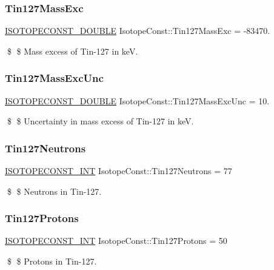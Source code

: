 \subsubsection{\texorpdfstring{Tin127\+Mass\+Exc}{Tin127MassExc}}
{\footnotesize\ttfamily \mbox{\hyperlink{group___isotope_const-_macros_ga8f45a7272ce02c0b4c65c44636ed719a}{I\+S\+O\+T\+O\+P\+E\+C\+O\+N\+S\+T\+\_\+\+D\+O\+U\+B\+LE}} Isotope\+Const\+::\+Tin127\+Mass\+Exc = -\/83470.}

\$ \$ Mass excess of Tin-\/127 in keV. \mbox{\label{group___isotope_const-_tin-_sn127_ga223b64a9a1fed5db23e75452f06ca7f2}} 
\subsubsection{\texorpdfstring{Tin127\+Mass\+Exc\+Unc}{Tin127MassExcUnc}}
{\footnotesize\ttfamily \mbox{\hyperlink{group___isotope_const-_macros_ga8f45a7272ce02c0b4c65c44636ed719a}{I\+S\+O\+T\+O\+P\+E\+C\+O\+N\+S\+T\+\_\+\+D\+O\+U\+B\+LE}} Isotope\+Const\+::\+Tin127\+Mass\+Exc\+Unc = 10.}

\$ \$ Uncertainty in mass excess of Tin-\/127 in keV. \mbox{\label{group___isotope_const-_tin-_sn127_ga81f1b0bce1cccc58d281ed7a2bd7276e}} 
\subsubsection{\texorpdfstring{Tin127\+Neutrons}{Tin127Neutrons}}
{\footnotesize\ttfamily \mbox{\hyperlink{group___isotope_const-_macros_ga5f18360b3e99483a35c32d789e62621c}{I\+S\+O\+T\+O\+P\+E\+C\+O\+N\+S\+T\+\_\+\+I\+NT}} Isotope\+Const\+::\+Tin127\+Neutrons = 77}

\$ \$ Neutrons in Tin-\/127. \mbox{\label{group___isotope_const-_tin-_sn127_gae1f20228102f5a677f08bf3c593258c4}} 
\subsubsection{\texorpdfstring{Tin127\+Protons}{Tin127Protons}}
{\footnotesize\ttfamily \mbox{\hyperlink{group___isotope_const-_macros_ga5f18360b3e99483a35c32d789e62621c}{I\+S\+O\+T\+O\+P\+E\+C\+O\+N\+S\+T\+\_\+\+I\+NT}} Isotope\+Const\+::\+Tin127\+Protons = 50}

\$ \$ Protons in Tin-\/127. 